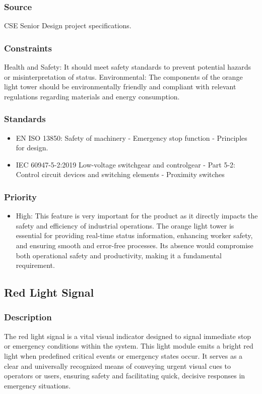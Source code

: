 \subsubsection{Source}
CSE Senior Design project specifications.
\subsubsection{Constraints}
Health and Safety: It should meet safety standards to prevent potential hazards or misinterpretation of status.
Environmental: The components of the orange light tower should be environmentally friendly and compliant with relevant regulations regarding materials and energy consumption.
\subsubsection{Standards}
\begin{itemize}
\item EN ISO 13850: Safety of machinery - Emergency stop function - Principles for design.
\item IEC 60947-5-2:2019 Low-voltage switchgear and controlgear - Part 5-2: Control circuit devices and switching elements - Proximity switches
\end{itemize}
\subsubsection{Priority}
\begin{itemize}
\item High:
This feature is very important for the product as it directly impacts the safety and efficiency of industrial operations. The orange light tower is essential for providing real-time status information, enhancing worker safety, and ensuring smooth and error-free processes. Its absence would compromise both operational safety and productivity, making it a fundamental requirement.
\end{itemize}
\subsection{Red Light Signal}
\subsubsection{Description}
The red light signal is a vital visual indicator designed to signal immediate stop or emergency conditions within the system. This light module emits a bright red light when predefined critical events or emergency states occur. It serves as a clear and universally recognized means of conveying urgent visual cues to operators or users, ensuring safety and facilitating quick, decisive responses in emergency situations.
